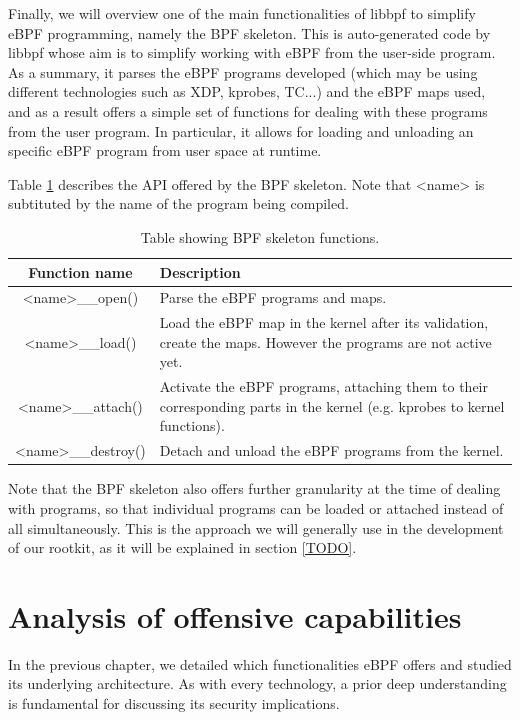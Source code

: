 \documentclass[12pt]{report} %
\begin{document}
Finally, we will overview one of the main functionalities of libbpf to simplify eBPF programming, namely the BPF skeleton. This is auto-generated code by libbpf whose aim is to simplify working with eBPF from the user-side program. As a summary, it parses the eBPF programs developed (which may be using different technologies such as XDP, kprobes, TC...) and the eBPF maps used, and as a result offers a simple set of functions for dealing with these programs from the user program. In particular, it allows for loading and unloading an specific eBPF program from user space at runtime.

Table \ref{table:libbpf_skel} describes the API offered by the BPF skeleton. Note that <name> is subtituted by the name of the program being compiled.

\begin{table}[H]
\begin{tabular}{|c|>{\centering\arraybackslash}p{10cm}|}
\hline
Function name & Description\\
\hline
\hline
<name>\_\_open() & Parse the eBPF programs and maps.\\
\hline
<name>\_\_load() & Load the eBPF map in the kernel after its validation, create the maps. However the programs are not active yet.\\
\hline
<name>\_\_attach() & Activate the eBPF programs, attaching them to their corresponding parts in the kernel (e.g. kprobes to kernel functions).\\
\hline
<name>\_\_destroy() & Detach and unload the eBPF programs from the kernel.\\
\hline
\end{tabular}
\caption{Table showing BPF skeleton functions.}
\label{table:libbpf_skel}
\end{table}

Note that the BPF skeleton also offers further granularity at the time of dealing with programs, so that individual programs can be loaded or attached instead of all simultaneously. This is the approach we will generally use in the development of our rootkit, as it will be explained in section \ref{TODO}.




\chapter{Analysis of offensive capabilities} \label{chapter:analysis_offensive_capabilities}
In the previous chapter, we detailed which functionalities eBPF offers and studied its underlying architecture. As with every technology, a prior deep understanding is fundamental for discussing its security implications. 
\end{document}
